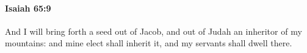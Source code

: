 
		\paragraph{Isaiah 65:9} %
			\label{ISAIAH-65-9}

			And I will bring forth a seed out of Jacob, and out of Judah an inheritor of my mountains: and mine elect shall inherit it, and my servants shall dwell there.



